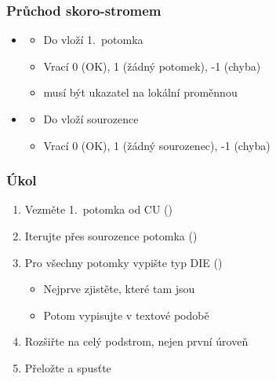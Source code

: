 \begin{frame}
  \frametitle{Průchod skoro-stromem}

  \begin{itemize}
    \item {}
    \begin{itemize}
      \item Do  vloží 1.\ potomka 
      \item Vrací 0 (OK), 1 (žádný potomek), -1 (chyba)
      \item {} musí být ukazatel na lokální proměnnou
    \end{itemize}

    \pause

    \item {}
    \begin{itemize}
      \item Do  vloží sourozence 
      \item Vrací 0 (OK), 1 (žádný sourozenec), -1 (chyba)
    \end{itemize}

  \end{itemize}

\end{frame}

\begin{frame}
  \frametitle{Úkol}

  \begin{enumerate}
    \item Vezměte 1.\ potomka od CU ()
    \item Iterujte přes sourozence potomka ()
    \item Pro všechny potomky vypište typ DIE ()
    \begin{itemize}
      \item Nejprve zjistěte, které tam jsou
      \item Potom vypisujte v textové podobě
    \end{itemize}

    \iffimuni
    \item Rozšiřte na celý podstrom, nejen první úroveň
    \fi
    \item Přeložte a spusťte
  \end{enumerate}

\end{frame}
